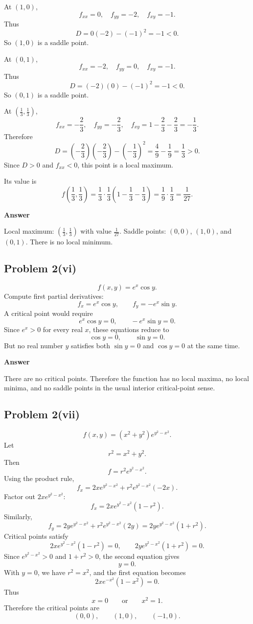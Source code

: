 \documentclass[11pt]{article}
\newenvironment{answerbox}[1]{\par\medskip\noindent\textcolor{linegreen}{\textbf{#1}}\par\smallskip}{\par\medskip}
\begin{document}
At $(1,0)$,
\[
f_{xx}=0,
\quad f_{yy}=-2,
\quad f_{xy}=-1.
\]
Thus
\[
D=0(-2)-(-1)^2=-1<0.
\]
So $(1,0)$ is a saddle point.

At $(0,1)$,
\[
f_{xx}=-2,
\quad f_{yy}=0,
\quad f_{xy}=-1.
\]
Thus
\[
D=(-2)(0)-(-1)^2=-1<0.
\]
So $(0,1)$ is a saddle point.

At $\left(\frac13,\frac13\right)$,
\[
f_{xx}=-\frac23,
\quad f_{yy}=-\frac23,
\quad f_{xy}=1-\frac23-\frac23=-\frac13.
\]
Therefore
\[
D=\left(-\frac23\right)\left(-\frac23\right)-\left(-\frac13\right)^2
=\frac49-\frac19
=\frac13>0.
\]
Since $D>0$ and $f_{xx}<0$, this point is a local maximum.

Its value is
\[
f\left(\frac13,\frac13\right)
=\frac13\cdot\frac13\left(1-\frac13-\frac13\right)
=\frac19\cdot\frac13
=\frac1{27}.
\]

\begin{answerbox}{Answer}
Local maximum: $\left(\frac13,\frac13\right)$ with value $\frac1{27}$.  Saddle points: $(0,0)$, $(1,0)$, and $(0,1)$.  There is no local minimum.
\end{answerbox}

\subsection*{Problem 2(vi)}
\[
f(x,y)=e^x\cos y.
\]
Compute first partial derivatives:
\[
f_x=e^x\cos y,
\qquad f_y=-e^x\sin y.
\]
A critical point would require
\[
e^x\cos y=0,
\qquad -e^x\sin y=0.
\]
Since $e^x>0$ for every real $x$, these equations reduce to
\[
\cos y=0,
\qquad \sin y=0.
\]
But no real number $y$ satisfies both $\sin y=0$ and $\cos y=0$ at the same time.

\begin{answerbox}{Answer}
There are no critical points. Therefore the function has no local maxima, no local minima, and no saddle points in the usual interior critical-point sense.
\end{answerbox}

\subsection*{Problem 2(vii)}
\[
f(x,y)=(x^2+y^2)e^{y^2-x^2}.
\]
Let
\[
r^2=x^2+y^2.
\]
Then
\[
f=r^2e^{y^2-x^2}.
\]
Using the product rule,
\[
f_x=2x e^{y^2-x^2}+r^2e^{y^2-x^2}(-2x).
\]
Factor out $2xe^{y^2-x^2}$:
\[
f_x=2xe^{y^2-x^2}(1-r^2).
\]
Similarly,
\[
f_y=2ye^{y^2-x^2}+r^2e^{y^2-x^2}(2y)
=2ye^{y^2-x^2}(1+r^2).
\]
Critical points satisfy
\[
2xe^{y^2-x^2}(1-r^2)=0,
\qquad
2ye^{y^2-x^2}(1+r^2)=0.
\]
Since $e^{y^2-x^2}>0$ and $1+r^2>0$, the second equation gives
\[
y=0.
\]
With $y=0$, we have $r^2=x^2$, and the first equation becomes
\[
2xe^{-x^2}(1-x^2)=0.
\]
Thus
\[
x=0
\qquad\text{or}\qquad x^2=1.
\]
Therefore the critical points are
\[
(0,0),
\qquad (1,0),
\qquad (-1,0).
\]
\end{document}
